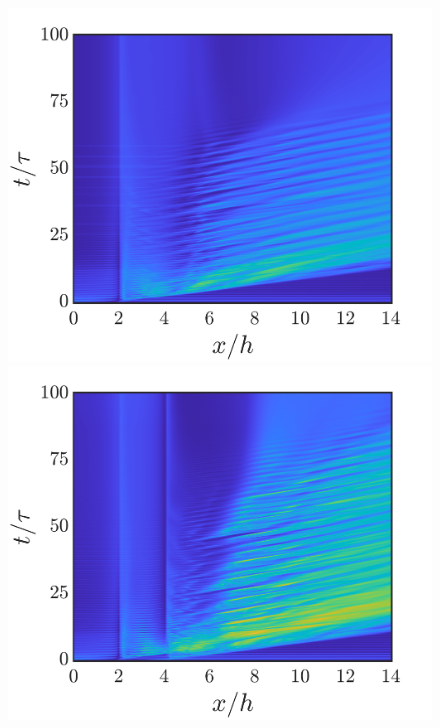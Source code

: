 \documentclass[reprint,a4paper,fleqn]{cas-dc} %
\begin{document}
		\begin{figure}[t]
			\vspace{0cm}
			\begin{minipage}[c]{0.24\linewidth}
				\includegraphics[width=1\linewidth,trim={1.6cm 2cm 2cm 1cm},clip]{Figures/MI_HL/spcaeTime_M_Singlea.png}
				\includegraphics[width=1\linewidth,trim={1.6cm 2cm 2cm 1cm},clip]{Figures/MI_HL/spcaeTime_M_4a.png}

\end{minipage}
\end{figure}
\end{document}

